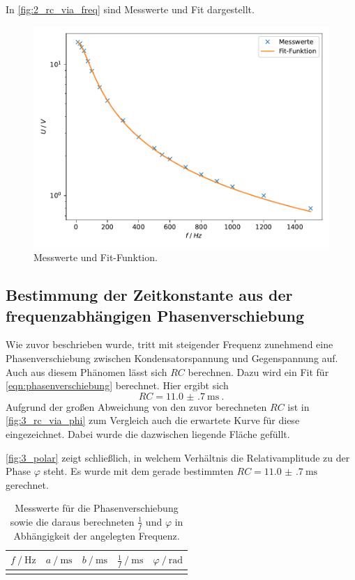 In \autoref{fig:2_rc_via_freq} sind Messwerte und Fit dargestellt.

\begin{figure}
    \centering
    \includegraphics[width=\textwidth]{build/plt/2_rc_via_freq.pdf}
    \caption{Messwerte und Fit-Funktion.}
    \label{fig:2_rc_via_freq}
\end{figure}

\clearpage
\subsection{Bestimmung der Zeitkonstante aus der frequenzabhängigen Phasenverschiebung}
\label{auswertung:3}

Wie zuvor beschrieben wurde,
tritt mit steigender Frequenz zunehmend eine Phasenverschiebung zwischen Kondensatorspannung und Gegenspannung auf.
Auch aus diesem Phänomen lässt sich $RC$ berechnen.
Dazu wird ein Fit für \autoref{eqn:phasenverschiebung} berechnet.
Hier ergibt sich
\[ RC = \SI{11.0(7)}{\milli\second} \ . \]
Aufgrund der großen Abweichung von den zuvor berechneten $RC$ ist in \autoref{fig:3_rc_via_phi}
zum Vergleich auch die erwartete Kurve für diese eingezeichnet.
Dabei wurde die dazwischen liegende Fläche gefüllt.

\autoref{fig:3_polar} zeigt schließlich,
in welchem Verhältnis die Relativamplitude zu der Phase $\varphi$ steht.
Es wurde mit dem gerade bestimmten $RC = \SI{11.0(7)}{\milli\second}$ gerechnet.

\begin{table}
  \centering
  \caption{Messwerte für die Phasenverschiebung
  sowie die daraus berechneten $\frac{1}{f}$ und $\varphi$
  in Abhängigkeit der angelegten Frequenz.}
  \label{tab:3}
  \begin{tabular}{S[table-format=4.0] S[table-format=1.2] S[table-format=2.2] S[table-format=2.2] S[table-format=1.2]}
    \toprule
    $f \mathbin{/} \si{\hertz}$ &
    $a \mathbin{/} \si{\milli\second}$ &
    $b \mathbin{/} \si{\milli\second}$ &
    $\frac{1}{f} \mathbin{/} \si{\milli\second}$ &
    $\varphi \mathbin{/} \si{\radian}$ \\
    \midrule
    \bottomrule
  \end{tabular}
\end{table}

